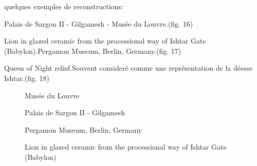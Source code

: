 \documentclass[a4paper,10pt,french]{sphinxhowto}
\begin{document}
quelques exemples de reconstructions:

Palais de Sargon II - Gilgamesh - Musée du Louvre.(fig. 16)

Lion in glazed ceramic from the processional way of Ishtar Gate (Babylon).Pergamon Museum, Berlin, Germany.(fig. 17)

Queen of Night relief.Souvent consideré comme une représentation de la déesse Ishtar.(fig. 18)
\begin{figure}[htbp]
\centering
\capstart

\caption{Palais de Sargon II - Gilgamesh}{\small 
Musée du Louvre
}\end{figure}
\begin{figure}[htbp]
\centering
\capstart

\caption{Lion in glazed ceramic from the processional way of Ishtar Gate (Babylon)}{\small 
Pergamon Museum, Berlin, Germany
}\end{figure}
\end{document}
